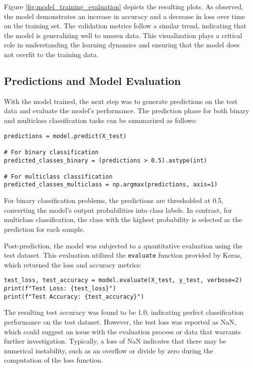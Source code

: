 \documentclass{report}
\begin{document}
Figure \ref{fig:model_training_evaluation} depicts the resulting plots. As observed, the model demonstrates an increase in accuracy and a decrease in loss over time on the training set. The validation metrics follow a similar trend, indicating that the model is generalizing well to unseen data. This visualization plays a critical role in understanding the learning dynamics and ensuring that the model does not overfit to the training data.


\subsection{Predictions and Model Evaluation}

With the model trained, the next step was to generate predictions on the test data and evaluate the model's performance. The prediction phase for both binary and multiclass classification tasks can be summarized as follows:

\begin{verbatim}
predictions = model.predict(X_test)

# For binary classification
predicted_classes_binary = (predictions > 0.5).astype(int)

# For multiclass classification
predicted_classes_multiclass = np.argmax(predictions, axis=1)
\end{verbatim}

For binary classification problems, the predictions are thresholded at 0.5, converting the model's output probabilities into class labels. In contrast, for multiclass classification, the class with the highest probability is selected as the prediction for each sample.

Post-prediction, the model was subjected to a quantitative evaluation using the test dataset. This evaluation utilized the \texttt{evaluate} function provided by Keras, which returned the loss and accuracy metrics:

\begin{verbatim}
test_loss, test_accuracy = model.evaluate(X_test, y_test, verbose=2)
print(f"Test Loss: {test_loss}")
print(f"Test Accuracy: {test_accuracy}")
\end{verbatim}

The resulting test accuracy was found to be 1.0, indicating perfect classification performance on the test dataset. However, the test loss was reported as NaN, which could suggest an issue with the evaluation process or data that warrants further investigation. Typically, a loss of NaN indicates that there may be numerical instability, such as an overflow or divide by zero during the computation of the loss function.
\end{document}
